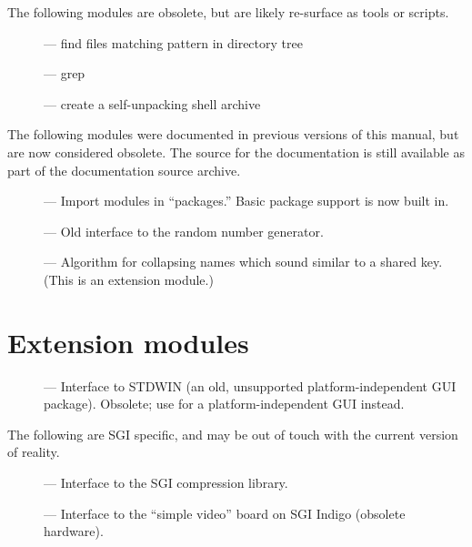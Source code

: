 The following modules are obsolete, but are likely re-surface as tools
or scripts.

\begin{description}
\item[]
--- find files matching pattern in directory tree

\item[]
--- grep

\item[]
--- create a self-unpacking \UNIX{} shell archive
\end{description}


The following modules were documented in previous versions of this
manual, but are now considered obsolete.  The source for the
documentation is still available as part of the documentation source
archive.

\begin{description}
\item[]
--- Import modules in ``packages.''  Basic package support is now
built in.

\item[]
--- Old interface to the random number generator.

\item[]
--- Algorithm for collapsing names which sound similar to a shared
key.  (This is an extension module.)
\end{description}


\section{Extension modules}

\begin{description}
\item[]
--- Interface to STDWIN (an old, unsupported
platform-independent GUI package).  Obsolete; use  for
a platform-independent GUI instead.
\end{description}

The following are SGI specific, and may be out of touch with the
current version of reality.

\begin{description}
\item[]
--- Interface to the SGI compression library.

\item[]
--- Interface to the ``simple video'' board on SGI Indigo
(obsolete hardware).
\end{description}
